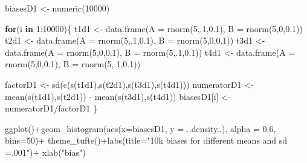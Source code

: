 \documentclass[
  10pt,
  dvipsnames,enabledeprecatedfontcommands]{scrartcl}
\newenvironment{Shaded}{\begin{snugshade}}{\end{snugshade}}
\newcommand{\AttributeTok}[1]{\textcolor[rgb]{0.77,0.63,0.00}{#1}}
\newcommand{\ControlFlowTok}[1]{\textcolor[rgb]{0.13,0.29,0.53}{\textbf{#1}}}
\newcommand{\DecValTok}[1]{\textcolor[rgb]{0.00,0.00,0.81}{#1}}
\newcommand{\FloatTok}[1]{\textcolor[rgb]{0.00,0.00,0.81}{#1}}
\newcommand{\FunctionTok}[1]{\textcolor[rgb]{0.00,0.00,0.00}{#1}}
\newcommand{\NormalTok}[1]{#1}
\newcommand{\OtherTok}[1]{\textcolor[rgb]{0.56,0.35,0.01}{#1}}
\newcommand{\SpecialCharTok}[1]{\textcolor[rgb]{0.00,0.00,0.00}{#1}}
\newcommand{\StringTok}[1]{\textcolor[rgb]{0.31,0.60,0.02}{#1}}
\begin{document}
\vspace{1mm}
\footnotesize

\begin{Shaded}
\begin{Highlighting}[]
\NormalTok{biasesD1 }\OtherTok{\textless{}{-}} \FunctionTok{numeric}\NormalTok{(}\DecValTok{10000}\NormalTok{)}

\ControlFlowTok{for}\NormalTok{(i }\ControlFlowTok{in} \DecValTok{1}\SpecialCharTok{:}\DecValTok{10000}\NormalTok{)\{}
\NormalTok{t1d1 }\OtherTok{\textless{}{-}} \FunctionTok{data.frame}\NormalTok{(}\AttributeTok{A  =} \FunctionTok{rnorm}\NormalTok{(}\DecValTok{5}\NormalTok{,.}\DecValTok{1}\NormalTok{,}\FloatTok{0.1}\NormalTok{), }\AttributeTok{B =} \FunctionTok{rnorm}\NormalTok{(}\DecValTok{5}\NormalTok{,}\DecValTok{0}\NormalTok{,}\FloatTok{0.1}\NormalTok{))}
\NormalTok{t2d1 }\OtherTok{\textless{}{-}} \FunctionTok{data.frame}\NormalTok{(}\AttributeTok{A  =} \FunctionTok{rnorm}\NormalTok{(}\DecValTok{5}\NormalTok{,.}\DecValTok{1}\NormalTok{,}\FloatTok{0.1}\NormalTok{), }\AttributeTok{B =} \FunctionTok{rnorm}\NormalTok{(}\DecValTok{5}\NormalTok{,}\DecValTok{0}\NormalTok{,}\FloatTok{0.1}\NormalTok{))}
\NormalTok{t3d1 }\OtherTok{\textless{}{-}} \FunctionTok{data.frame}\NormalTok{(}\AttributeTok{A  =} \FunctionTok{rnorm}\NormalTok{(}\DecValTok{5}\NormalTok{,}\DecValTok{0}\NormalTok{,}\FloatTok{0.1}\NormalTok{), }\AttributeTok{B =} \FunctionTok{rnorm}\NormalTok{(}\DecValTok{5}\NormalTok{,.}\DecValTok{1}\NormalTok{,}\FloatTok{0.1}\NormalTok{))}
\NormalTok{t4d1 }\OtherTok{\textless{}{-}} \FunctionTok{data.frame}\NormalTok{(}\AttributeTok{A  =} \FunctionTok{rnorm}\NormalTok{(}\DecValTok{5}\NormalTok{,}\DecValTok{0}\NormalTok{,}\FloatTok{0.1}\NormalTok{), }\AttributeTok{B =} \FunctionTok{rnorm}\NormalTok{(}\DecValTok{5}\NormalTok{,.}\DecValTok{1}\NormalTok{,}\FloatTok{0.1}\NormalTok{))}

\NormalTok{factorD1 }\OtherTok{\textless{}{-}} \FunctionTok{sd}\NormalTok{(}\FunctionTok{c}\NormalTok{(}\FunctionTok{s}\NormalTok{(t1d1),}\FunctionTok{s}\NormalTok{(t2d1),}\FunctionTok{s}\NormalTok{(t3d1),}\FunctionTok{s}\NormalTok{(t4d1)))}
\NormalTok{numeratorD1 }\OtherTok{\textless{}{-}}  \FunctionTok{mean}\NormalTok{(}\FunctionTok{s}\NormalTok{(t1d1),}\FunctionTok{s}\NormalTok{(t2d1)) }\SpecialCharTok{{-}} \FunctionTok{mean}\NormalTok{(}\FunctionTok{s}\NormalTok{(t3d1),}\FunctionTok{s}\NormalTok{(t4d1))}
\NormalTok{biasesD1[i] }\OtherTok{\textless{}{-}}\NormalTok{ numeratorD1}\SpecialCharTok{/}\NormalTok{factorD1}
\NormalTok{\}}

\FunctionTok{ggplot}\NormalTok{()}\SpecialCharTok{+}\FunctionTok{geom\_histogram}\NormalTok{(}\FunctionTok{aes}\NormalTok{(}\AttributeTok{x=}\NormalTok{biasesD1, }\AttributeTok{y =}\NormalTok{ ..density..), }\AttributeTok{alpha =} \FloatTok{0.6}\NormalTok{, }\AttributeTok{bins=}\DecValTok{50}\NormalTok{)}\SpecialCharTok{+}
  \FunctionTok{theme\_tufte}\NormalTok{()}\SpecialCharTok{+}\FunctionTok{labs}\NormalTok{(}\AttributeTok{title=}\StringTok{"10k biases for different means and sd =.001"}\NormalTok{)}\SpecialCharTok{+} \FunctionTok{xlab}\NormalTok{(}\StringTok{"bias"}\NormalTok{)}
\end{Highlighting}
\end{Shaded}
\end{document}
